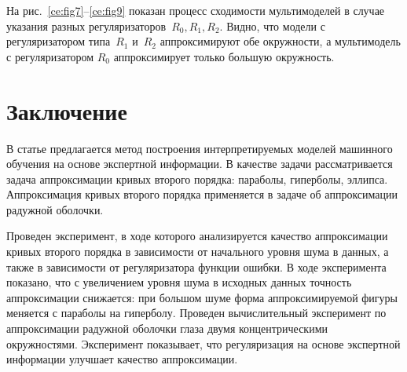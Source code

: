 \documentclass[12pt]{a&t}
\begin{document}
На рис.~\ref{ce:fig7}--\ref{ce:fig9} показан процесс сходимости мультимоделей в случае указания разных регуляризаторов~$R_0, R_1, R_2$. Видно, что модели с регуляризатором типа~$R_1$ и~$R_2$ аппроксимируют обе окружности, а мультимодель с регуляризатором $R_0$ аппроксимирует только большую окружность.

\section{Заключение}
В статье предлагается метод построения интерпретируемых моделей машинного обучения на основе экспертной информации. В качестве задачи рассматривается задача аппроксимации кривых второго порядка: параболы, гиперболы, эллипса. Аппроксимация кривых второго порядка применяется в задаче об аппроксимации радужной оболочки.

Проведен эксперимент, в ходе которого анализируется качество аппроксимации кривых второго порядка в зависимости от начального уровня шума в данных, а также в зависимости от регуляризатора функции ошибки. В ходе эксперимента показано, что с увеличением уровня шума в исходных данных точность аппроксимации снижается: при большом шуме форма аппроксимируемой фигуры меняется с параболы на гиперболу. Проведен вычислительный эксперимент по аппроксимации радужной оболочки глаза двумя концентрическими окружностями. Эксперимент показывает, что регуляризация на основе экспертной информации улучшает качество аппроксимации.
\end{document}
